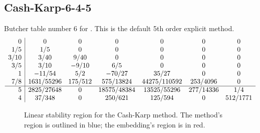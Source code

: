 \documentclass[letterpaper,10pt,english]{sphinxmanual}
\begin{document}
\subsection{Cash-Karp-6-4-5}
\label{Butcher:cash-karp-6-4-5}\label{Butcher:butcher-cash-karp}
Butcher table number 6
for {\hyperref[c_interface/User_callable:c.ARKodeSetERKTableNum]{\emph{}}}.  This is
the default 5th order explicit method.
\begin{gather}
\begin{split}\begin{array}{r|cccccc}
  0 & 0 & 0 & 0 & 0 & 0 & 0 \\
  1/5 & 1/5 & 0 & 0 & 0 & 0 & 0 \\
  3/10 & 3/40 & 9/40 & 0 & 0 & 0 & 0 \\
  3/5 & 3/10 & -9/10 & 6/5 & 0 & 0 & 0 \\
  1 & -11/54 & 5/2 & -70/27 & 35/27 & 0 & 0 \\
  7/8 & 1631/55296 & 175/512 & 575/13824 & 44275/110592 & 253/4096 & 0 \\
  \hline
  5 & 2825/27648 & 0 & 18575/48384 & 13525/55296 & 277/14336 & 1/4 \\
  4 & 37/348 & 0 & 250/621 & 125/594 & 0 & 512/1771
\end{array}\end{split}\notag
\end{gather}\begin{figure}[htbp]
\centering
\capstart

\caption{Linear stability region for the Cash-Karp method.  The method's
region is outlined in blue; the embedding's region is in red.}\end{figure}
\end{document}
